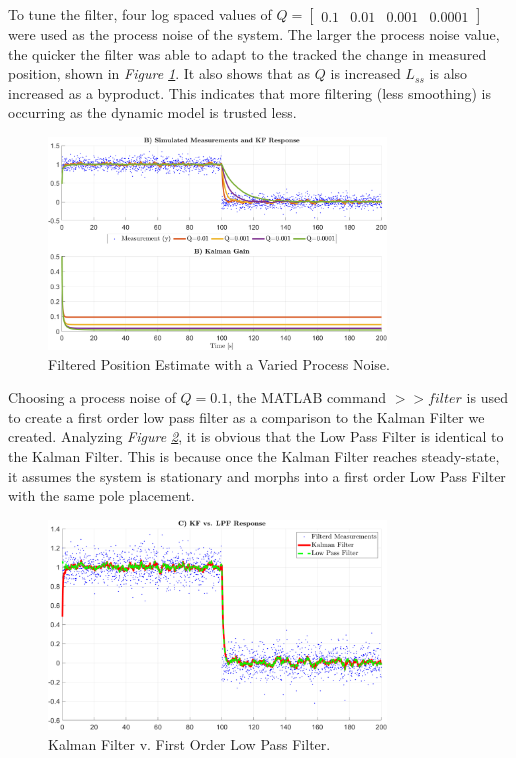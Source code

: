 \documentclass[10pt]{article}
\begin{document}
\begin{enumerate}[label=\textbf{\arabic*.}]
  To tune the filter, four log spaced values of $Q = \begin{bmatrix} 0.1 & 0.01 
  & 0.001 & 0.0001 \end{bmatrix}$ were used as the process noise of the system. 
  The larger the process noise value, the quicker the filter was able to adapt 
  to the tracked the change in measured position, shown in \emph{Figure 
  \ref{f:2.2}}. It also shows that as $Q$ is increased $L_{ss}$ is also 
  increased as a byproduct. This indicates that more filtering (less smoothing) 
  is occurring as the dynamic model is trusted less.
  \begin{figure}[H]
    \centering
    \includegraphics[width=0.8\textwidth]{p2_b.png}
    \caption{Filtered Position Estimate with a Varied Process Noise.}
    \label{f:2.2}
  \end{figure}

  Choosing a process noise of $Q=0.1$, the MATLAB command $>>filter$ is used to 
  create a first order low pass filter as a comparison to the Kalman Filter we 
  created. Analyzing \emph{Figure \ref{f:2.3}}, it is obvious that the Low Pass 
  Filter is identical to the Kalman Filter. This is because once the Kalman 
  Filter reaches steady-state, it assumes the system is stationary and morphs 
  into a first order Low Pass Filter with the same pole placement.
  \begin{figure}[H]
    \centering
    \includegraphics[width=0.8\textwidth]{p2_c.png}
    \caption{Kalman Filter v. First Order Low Pass Filter.}
    \label{f:2.3}
  \end{figure}


\end{enumerate}
\end{document}
